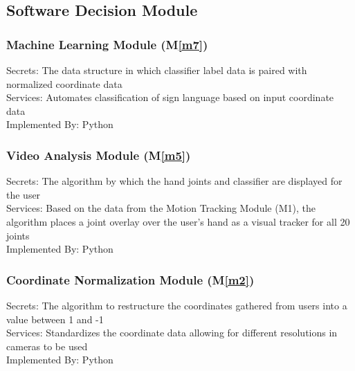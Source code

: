 \documentclass[12pt, titlepage]{article}
\newcommand{\mref}[1]{M\ref{#1}}
\begin{document}
\subsection{Software Decision Module}

\subsubsection{Machine Learning Module (\mref{m7})}

\begin{description}
  \item[Secrets: The data structure in which classifier label data is paired with normalized coordinate data]
  \item[Services: Automates classification of sign language based on input coordinate data] 
  \item[Implemented By: Python] 
  \end{description}
  

\subsubsection{Video Analysis Module (\mref{m5})}

\begin{description}
  \item[Secrets: The algorithm by which the hand joints and classifier are displayed for the user]
  \item[Services: Based on the data from the Motion Tracking Module (M1), the algorithm places a joint overlay over the user’s hand as a visual tracker for all 20 joints] 
  \item[Implemented By: Python] 
  \end{description}
  


\subsubsection{Coordinate Normalization Module (\mref{m2})}

\begin{description}
  \item[Secrets: The algorithm to restructure the coordinates gathered from users into a value between 1 and -1]
  \item[Services: Standardizes the coordinate data allowing for different resolutions in cameras to be used] 
  \item[Implemented By: Python] 
  \end{description}
  
\end{document}
